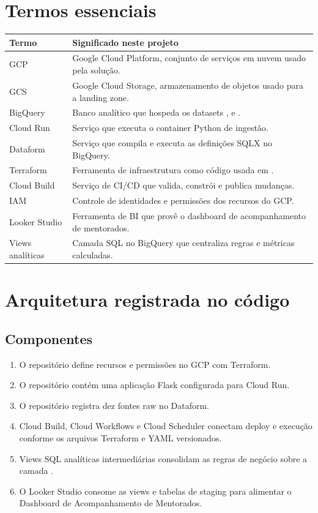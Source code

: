 \documentclass[11pt,a4paper]{article}
\begin{document}
\section{Termos essenciais}

\begin{tabularx}{\textwidth}{L{32mm}Y}
\toprule
\textbf{Termo} & \textbf{Significado neste projeto} \\
\midrule
GCP & Google Cloud Platform, conjunto de serviços em nuvem usado pela solução. \\
GCS & Google Cloud Storage, armazenamento de objetos usado para a landing zone. \\
BigQuery & Banco analítico que hospeda os datasets ,  e . \\
Cloud Run & Serviço que executa o container Python de ingestão. \\
Dataform & Serviço que compila e executa as definições SQLX no BigQuery. \\
Terraform & Ferramenta de infraestrutura como código usada em . \\
Cloud Build & Serviço de CI/CD que valida, constrói e publica mudanças. \\
IAM & Controle de identidades e permissões dos recursos do GCP. \\
Looker Studio & Ferramenta de BI que provê o dashboard de acompanhamento de mentorados. \\
Views analíticas & Camada SQL no BigQuery que centraliza regras e métricas calculadas. \\
\bottomrule
\end{tabularx}

\section{Arquitetura registrada no código}

\subsection{Componentes}

\begin{enumerate}
  \item O repositório  define recursos e permissões no GCP com
  Terraform.
  \item O repositório  contém uma aplicação Flask
  configurada para Cloud Run.
  \item O repositório  registra dez fontes raw no Dataform.
  \item Cloud Build, Cloud Workflows e Cloud Scheduler conectam deploy e
  execução conforme os arquivos Terraform e YAML versionados.
  \item Views SQL analíticas intermediárias consolidam as regras de negócio
  sobre a camada .
  \item O Looker Studio consome as views e tabelas de staging para alimentar
  o Dashboard de Acompanhamento de Mentorados.
\end{enumerate}
\end{document}
